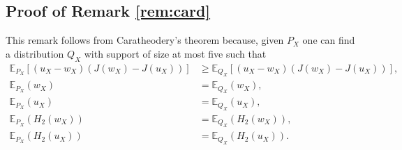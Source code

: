 \documentclass[conference,letterpaper,onecolumn]{IEEEtran}
\theoremstyle{plain}%
\begin{document}
\subsection{Proof of Remark \ref{rem:card}}
This remark follows from  
Caratheodery's theorem because, given $P_X$ one can find a distribution $Q_X$ with support of size at most
five such that
{\begin{align*}
    \mathbb{E}_{P_X}[(u_X-w_X)(J(w_X) - J(u_X))]&\geq \mathbb{E}_{Q_X}[(u_X-w_X)(J(w_X) - J(u_X))],\\
    \mathbb{E}_{P_X}(w_X)&=\mathbb{E}_{Q_X}(w_X),\\
    \mathbb{E}_{P_X}(u_X)&=\mathbb{E}_{Q_X}(u_X),\\
    \mathbb{E}_{P_X}(H_2(w_X))&=\mathbb{E}_{Q_X}(H_2(w_X)),\\
    \mathbb{E}_{P_X}(H_2(u_X))&=\mathbb{E}_{Q_X}(H_2(u_X)).
\end{align*}}



\end{document}
